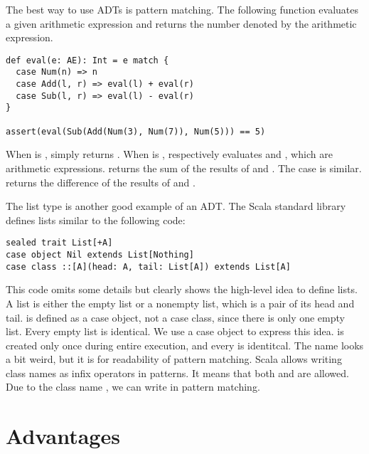 The best way to use ADTs is pattern matching. The following function evaluates a
given arithmetic expression and returns the number denoted by the arithmetic
expression.

\begin{verbatim}
def eval(e: AE): Int = e match {
  case Num(n) => n
  case Add(l, r) => eval(l) + eval(r)
  case Sub(l, r) => eval(l) - eval(r)
}

assert(eval(Sub(Add(Num(3), Num(7)), Num(5))) == 5)
\end{verbatim}

When  is ,  simply returns .
When  is ,  respectively evaluates 
and , which are arithmetic expressions.  returns the sum of
the results of  and .
The  case is similar.  returns the difference of
the results of  and .

The list type is another good example of an ADT. The Scala standard library defines
lists similar to the following code:

\begin{verbatim}
sealed trait List[+A]
case object Nil extends List[Nothing]
case class ::[A](head: A, tail: List[A]) extends List[A]
\end{verbatim}

This code omits some details but clearly shows the high-level idea to define
lists.
A list is either the empty
list or a nonempty list, which is a pair of its head and tail.  is
defined as a case object, not a case class, since there is only one empty list.
Every empty list is identical. We use a case object to express this idea.
 is created only once during entire execution, and every  is
identitcal. The name \code{::} looks a bit weird, but it is for
readability of pattern matching. Scala allows writing class names as infix
operators in patterns. It means that both  and  are allowed. Due to the class name \code{::}, we can write  in pattern matching.

\section{Advantages}

